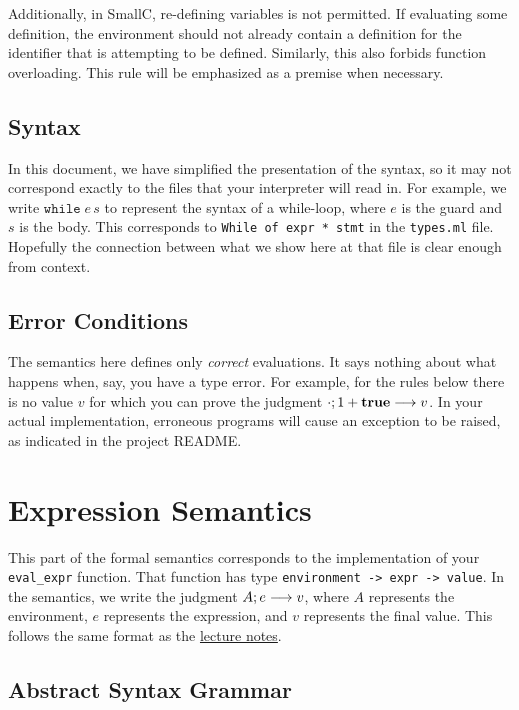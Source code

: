 \documentclass[10pt]{article}
\begin{document}
Additionally, in SmallC, re-defining variables is not permitted. If evaluating some definition, the environment should not already contain a definition for the identifier that is attempting to be defined. Similarly, this also forbids function overloading. This rule will be emphasized as a premise when necessary. 

\subsection{Syntax}

In this document, we have simplified the presentation of the syntax,
so it may not correspond exactly to the files that your interpreter
will read in. For example, we write $\mathtt{while}\;e\,s$ to
represent the syntax of a while-loop, where $e$ is the guard and $s$
is the body. This corresponds to \texttt{While of expr * stmt} in the
\texttt{types.ml} file. Hopefully the connection between what we show
here at that file is clear enough from context.

\subsection{Error Conditions}

The semantics here defines only \emph{correct} evaluations. It says
nothing about what happens when, say, you have a type error. For
example, for the rules below there is no value $v$ for which you can
prove the judgment $\config[\cdot]{1+\mathbf{true}} --> v$. In your actual
implementation, erroneous programs will cause an exception to be
raised, as indicated in the project README.

\section{Expression Semantics}

This part of the formal semantics corresponds to the implementation of
your \texttt{eval\_expr} function. That function has type
\texttt{environment -> expr -> value}. In the semantics, we write the
judgment $\config{e} --> v$, where $A$ represents the environment, $e$
represents the expression, and $v$ represents the final value. This
follows the same format as the \href{https://bakalian.cs.umd.edu/330/slides}{lecture notes}.

\subsection{Abstract Syntax Grammar}
\end{document}
